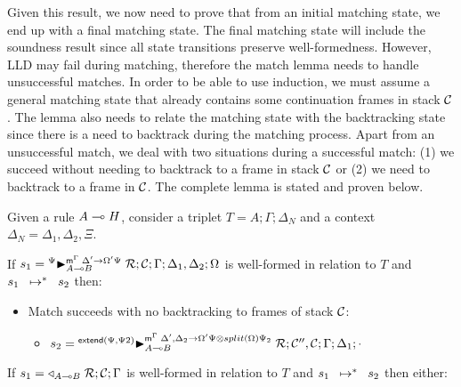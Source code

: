 Given this result, we now need to prove that from an initial matching state, we
end up with a final matching state. The final matching state will include the
soundness result since all state transitions preserve well-formedness.
However, LLD may fail during matching, therefore the match lemma needs to handle
unsuccessful matches. In order to be able to use induction, we must assume a
general matching state that  already contains some continuation frames in
stack $\lstack{C}$. The lemma also needs to relate the matching state with the
backtracking state since there is a need to backtrack during the matching
process. Apart from an unsuccessful match, we deal with two situations
during a successful match: (1) we succeed without needing to backtrack to a
frame in stack $\lstack{C}$ or (2) we need to backtrack to a frame in
$\lstack{C}$. The complete lemma is stated and proven below.


\begin{lemma}\label{thm:body_match}
   
Given a rule $A \lolli H$, consider a triplet $T = A; \Gamma; \Delta_{N}$ and a
context $\Delta_{N} = \Delta_1, \Delta_2, \Xi$.

If $s_1 = \matstateb{A \lolli B}{\rulestk}{\lstack{C}}{\Gamma}{\Delta_1,
   \Delta_2}{\Omega}{\Delta' \rightarrow \Omega'\Psi}{\Psi}$
is well-formed in relation to $T$ and $\transs{s_1}{s_2}$ then:

\begin{itemize}[leftmargin=*]
   \item Match succeeds with no backtracking to frames of stack $\lstack{C}$:
   \begin{itemize}[leftmargin=\secondm]
      \item $s_2 = \matstateb{A \lolli B}{\rulestk}{\lstack{C''},
         \lstack{C}}{\Gamma}{\Delta_1}{\cdot}{\Delta', \Delta_2 \rightarrow
         \Omega'\Psi \otimes split(\Omega)\Psi_2}{\m{extend}(\Psi, \Psi2)}$
   \end{itemize}

   

\end{itemize}

If $s_1 = \contstate{A \lolli B}{\rulestk}{\lstack{C}}{\Gamma}$ 
is well-formed in relation to $T$ and $\transs{s_1}{s_2}$ then either:

\begin{itemize}[leftmargin=*]
   
\end{itemize}
\end{lemma}

